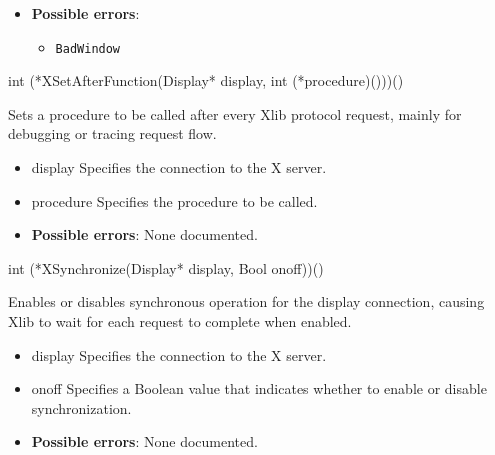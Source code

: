 \documentclass{report}
\begin{document}
\begin{itemize}
        \begin{itemize}
            \item \textbf{Possible errors}:
                \begin{itemize}
                    \item \texttt{BadWindow}
                \end{itemize}
        \end{itemize}

        \begin{cppcode}
            int (*XSetAfterFunction(Display* display, int (*procedure)()))()
        \end{cppcode}
        \bigbreak \noindent
        Sets a procedure to be called after every Xlib protocol request, mainly for debugging or tracing request flow.

        \begin{itemize}
            \item display Specifies the connection to the X server.
            \item procedure Specifies the procedure to be called.
        \end{itemize}

        \begin{itemize}
            \item \textbf{Possible errors}: None documented.
        \end{itemize}

        \begin{cppcode}
            int (*XSynchronize(Display* display, Bool onoff))()
        \end{cppcode}
        \bigbreak \noindent
        Enables or disables synchronous operation for the display connection, causing Xlib to wait for each request to complete when enabled.

        \begin{itemize}
            \item display Specifies the connection to the X server.
            \item onoff Specifies a Boolean value that indicates whether to enable or disable synchronization.
        \end{itemize}

        \begin{itemize}
            \item \textbf{Possible errors}: None documented.
        \end{itemize}


\end{itemize}
\end{document}
